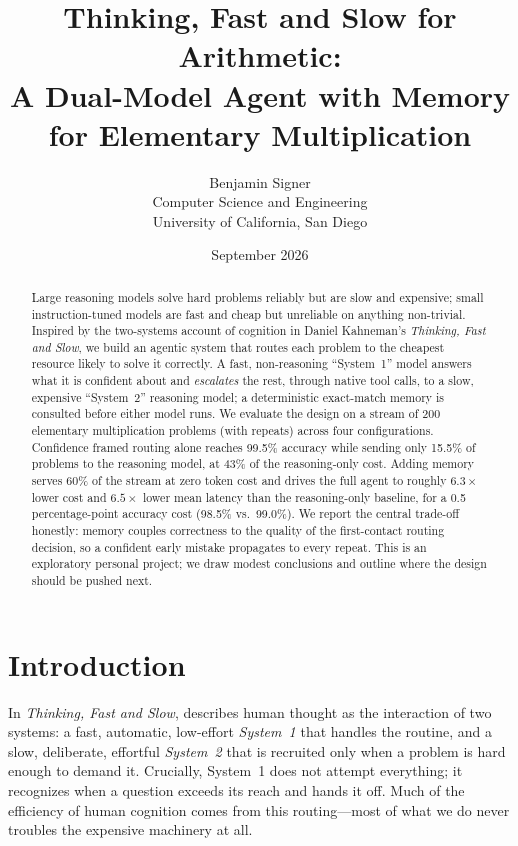 \documentclass[11pt]{article}
\title{\textbf{Thinking, Fast and Slow for Arithmetic:\\
A Dual-Model Agent with Memory for Elementary Multiplication}}
\author{Benjamin Signer\\
\small Computer Science and Engineering\\
\small University of California, San Diego}
\date{September 2026}
\newcommand{\sysone}{System~1}
\newcommand{\systwo}{System~2}
\begin{document}
\maketitle

\begin{abstract}
\noindent
Large reasoning models solve hard problems reliably but are slow and expensive;
small instruction-tuned models are fast and cheap but unreliable on anything
non-trivial. Inspired by the two-systems account of cognition in Daniel
Kahneman's \emph{Thinking, Fast and Slow}, we build an agentic system that
routes each problem to the cheapest resource likely to solve it correctly. A
fast, non-reasoning ``\sysone'' model answers what it is confident about and
\emph{escalates} the rest, through native tool calls, to a slow, expensive
``\systwo'' reasoning model; a deterministic exact-match memory is consulted
before either model runs. We evaluate the design on a stream of 200 elementary
multiplication problems (with repeats) across four configurations. Confidence
framed routing alone reaches 99.5\% accuracy while sending only 15.5\% of
problems to the reasoning model, at 43\% of the reasoning-only cost. Adding
memory serves 60\% of the stream at zero token cost and drives the full agent to
roughly $6.3\times$ lower cost and $6.5\times$ lower mean latency than the
reasoning-only baseline, for a 0.5 percentage-point accuracy cost (98.5\% vs.\
99.0\%). We report the central trade-off honestly: memory couples correctness to
the quality of the first-contact routing decision, so a confident early mistake
propagates to every repeat. This is an exploratory personal project; we draw
modest conclusions and outline where the design should be pushed next.
\end{abstract}

\section{Introduction}
\label{sec:intro}

In \emph{Thinking, Fast and Slow}, \citet{kahneman2011} describes human thought
as the interaction of two systems: a fast, automatic, low-effort \emph{System~1}
that handles the routine, and a slow, deliberate, effortful \emph{System~2} that
is recruited only when a problem is hard enough to demand it. Crucially, System~1
does not attempt everything; it recognizes when a question exceeds its reach and
hands it off. Much of the efficiency of human cognition comes from this
routing---most of what we do never troubles the expensive machinery at all.
\end{document}
